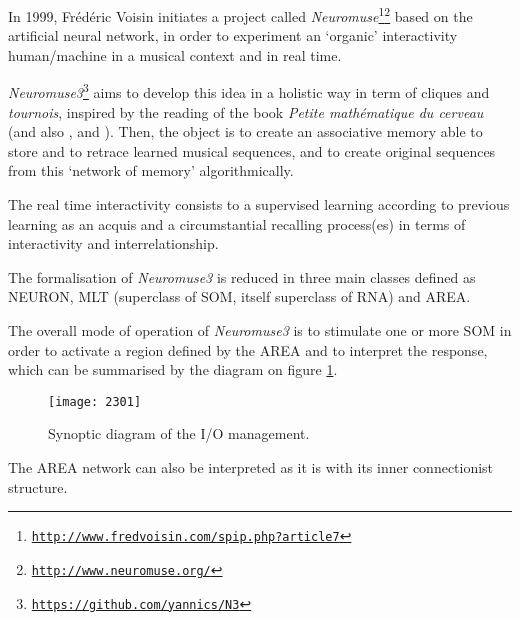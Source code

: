 In 1999, Frédéric Voisin initiates a project called \textsl{Neuromuse}\footnote{\href{http://www.fredvoisin.com/spip.php?article7}{\texttt{\scriptsize http://www.fredvoisin.com/spip.php?article7}}}\footnote{\href{http://www.neuromuse.org/}{\texttt{\scriptsize http://www.neuromuse.org/}}} based on the artificial neural network, in order to experiment an `organic' interactivity human/machine in a musical context and in real time.

\bigskip

\textsl{Neuromuse3}\footnote{\href{https://github.com/yannics/N3}{\texttt{\scriptsize https://github.com/yannics/N3}}} aims to develop this idea in a holistic way in term of cliques and \textit{tournois}, inspired by the reading of the book \textit{Petite mathématique du cerveau} \citep{bg1} (and also \citep{bg2}, \citep{bg3} and \citep{bg4}).
Then, the object is to create an associative memory able to store and to retrace learned musical sequences, and to create original sequences from this `network of memory' algorithmically.

The real time interactivity consists to a supervised learning according to previous learning as an acquis and a circumstantial recalling process(es) in terms of interactivity and interrelationship.

\bigskip

The formalisation of \textsl{Neuromuse3} is reduced in three main classes defined as NEURON, MLT (superclass of SOM, itself superclass of RNA) and AREA.

The overall mode of operation of \textsl{Neuromuse3} is to stimulate one or more SOM in order to activate a region defined by the AREA and to interpret the response, which can be summarised by the diagram on figure \ref{fig:io}.

\begin{figure}[htbp]
\begin{center}
\texttt{[image: 2301]}
\caption{Synoptic diagram of the I/O management. 
}
\label{fig:io}
\end{center}
\end{figure}

The AREA network can also be interpreted as it is with its inner connectionist structure.